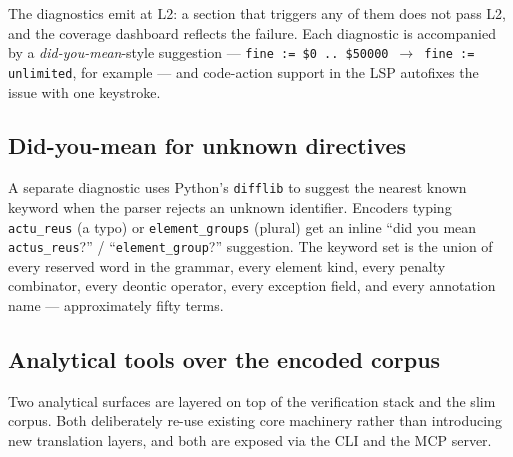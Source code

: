 The diagnostics emit at L2: a section that triggers any of them does
not pass L2, and the coverage dashboard reflects the failure. Each
diagnostic is accompanied by a \emph{did-you-mean}-style suggestion ---
\texttt{fine := \$0 .. \$50000} \,$\rightarrow$\, \texttt{fine := unlimited}, for
example --- and code-action support in the LSP autofixes the issue with
one keystroke.

\subsection{Did-you-mean for unknown directives}
A separate diagnostic uses Python's \texttt{difflib} to suggest the
nearest known keyword when the parser rejects an unknown identifier.
Encoders typing \texttt{actu\_reus} (a typo) or \texttt{element\_groups}
(plural) get an inline ``did you mean \texttt{actus\_reus}?'' /
``\texttt{element\_group}?'' suggestion. The keyword set is the union
of every reserved word in the grammar, every element kind, every
penalty combinator, every deontic operator, every exception field,
and every annotation name --- approximately fifty terms.

\subsection{Analytical tools over the encoded corpus}
\label{subsec:analytical_tools}

Two analytical surfaces are layered on top of the verification stack
and the slim corpus. Both deliberately re-use existing core machinery
rather than introducing new translation layers, and both are exposed
via the CLI and the MCP server.

